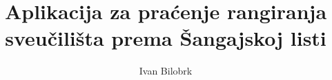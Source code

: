 \documentclass[times, utf8, zavrsni]{fer}
\begin{document}

\title{Aplikacija za praćenje rangiranja sveučilišta prema Šangajskoj listi}

\author{Ivan Bilobrk}

\maketitle



\zahvala{}

\tableofcontents
\end{document}
